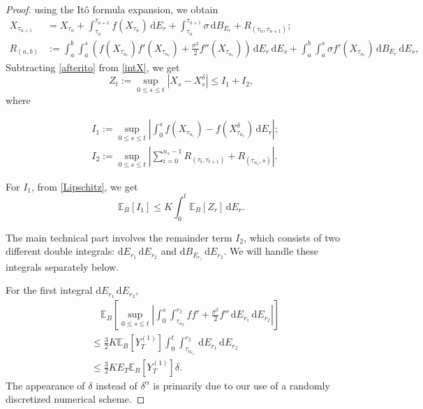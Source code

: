 \documentclass[10pt,reqno,final]{amsart}
\theoremstyle{plain}
\theoremstyle{definition}
\theoremstyle{remark}
\numberwithin{equation}{section}
\numberwithin{figure}{section}
\numberwithin{table}{section}
\begin{document}
\begin{proof}
using the Itô formula expansion, we obtain
\begin{align}\label{afterito}
	X_{\tau_{n+1}} &= X_{\tau_n} +  \int_{\tau_n}^{\tau_{n+1}} f(X_{\tau_n}) \, \mathrm{d}E_r + \int_{\tau_n}^{\tau_{n+1}} \sigma \, \mathrm{d}B_{E_r} + R_{(\tau_n, \tau_{n+1})}; \\
	R_{(a,b)} &:=  \int_a^b \int_a^{s} \left( f(X_{\tau_{n_{r}}})f'(X_{\tau_{n_{r}}}) + \frac{\sigma ^2}{2} f''(X_{\tau_{n_{r}}})  \right) \, \mathrm{d}E_{r} \, \mathrm{d}E_{s} + \int_a^b \int_a^{s} \sigma f'(X_{\tau_{n_{r}}})   \, \mathrm{d}B_{E_{r}} \,\mathrm{d}E_{s},
\end{align}
Subtracting \cref{afterito} from \cref{intX}, we get
$$Z_t := \sup_{0 \leq s \leq t} | X_s - {X_s^\delta} | \leq I_1 + I_2,$$ where

$$
\begin{aligned}
	&I_1 := \sup_{0 \leq s \leq t} \left| \int_0^s f(X_{\tau_{n_r}}) - f(X_{\tau_{n_r}}^\delta)  \, \mathrm{d}E_r \right|; \\
	&I_2 := \sup_{0 \leq s \leq t} \left| \sum_{i=0}^{n_s - 1} R_{(\tau_{t}, \tau_{t+1})} + R_{(\tau_{n_s}, s)} \right|.
\end{aligned}
$$

For $I_1$, from \cref{Lipschitz}, we get
\begin{equation}\label{I1}
	\mathbb{E}_B[I_1] \leq K \int_0^t \mathbb{E}_B[Z_r] \, \mathrm{d}E_r.
\end{equation}

The main technical part involves the remainder term $I_2$, which consists of two different double integrals: $\mathrm{d}E_{r_1} \, \mathrm{d}E_{r_2}$ and $\mathrm{d}B_{E_{r_1}} \, \mathrm{d}E_{r_2}$. We will handle these integrals separately below.

For the first integral $\mathrm{d}E_{r_1} \, \mathrm{d}E_{r_2}$,
\begin{align}
	& \quad \mathbb{E}_B \left[\sup_{0 \leq s \leq t} \left| \int_0^s \int_{\tau_{n_2}}^{r_2} ff'  + \frac{\sigma^2}{2} f'' \, \mathrm{d}E_{r_1} \, \mathrm{d}E_{r_2} \right|\right] \nonumber \\
	&\leq  \frac{3}{2}K \mathbb{E}_B[Y_T^{(1)}] \int_0^t \int_{\tau_{n_{r_2}}}^{r_2} \, \mathrm{d}E_{r_1} \, \mathrm{d}E_{r_2} \nonumber \\
	&\leq  \frac{3}{2}K E_T \mathbb{E}_B[Y_T^{(1)}] \delta.  \label{I21}
\end{align}
The appearance of $\delta$ instead of $\delta^{\alpha}$ is primarily due to our use of a randomly discretized numerical scheme.


\end{proof}
\end{document}
